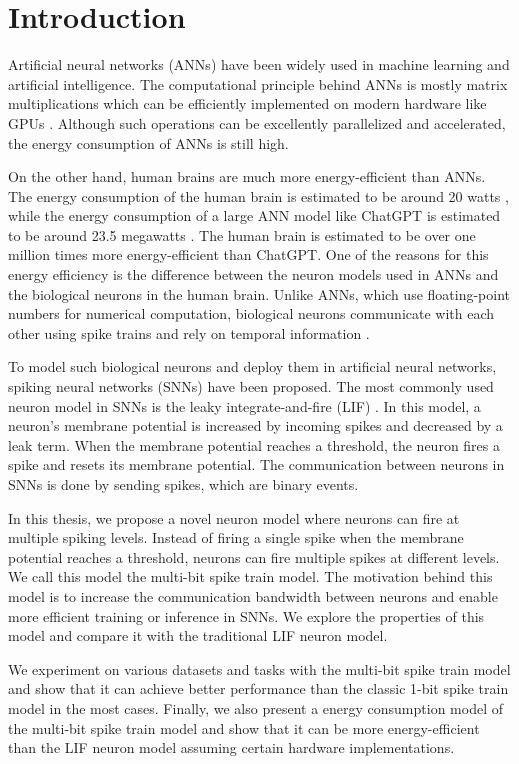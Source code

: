 \chapter{Introduction}
\label{chap:introduction}

Artificial neural networks (ANNs) \cite{mcculloch1943logical} have been widely used in machine learning and artificial intelligence. The computational principle behind ANNs is mostly matrix multiplications which can be efficiently implemented on modern hardware like GPUs \cite{oh2004gpu}. Although such operations can be excellently parallelized and accelerated, the energy consumption of ANNs is still high.

On the other hand, human brains are much more energy-efficient than ANNs. The energy consumption of the human brain is estimated to be
around 20 watts \cite{doi:10.1073/pnas.2107022118}, while the energy consumption of a large ANN model like ChatGPT is estimated to be around 23.5 megawatts \cite{DEVRIES20232191}. The human brain is estimated to be over one million times more energy-efficient than ChatGPT. One of the reasons for this energy efficiency is the difference between the neuron models used in ANNs and the biological neurons in the human brain. Unlike ANNs, which use floating-point numbers for numerical computation, biological neurons communicate with each other using spike trains and rely on temporal information \cite{jphysiol.1952.sp004764}.

To model such biological neurons and deploy them in artificial neural networks, spiking neural networks (SNNs) have been proposed. The most commonly used neuron model in SNNs is the leaky integrate-and-fire (LIF) \cite{lapicque1907louis}. In this model, a neuron's membrane potential is increased by incoming spikes and decreased by a leak term. When the membrane potential reaches a threshold, the neuron fires a spike and resets its membrane potential. The communication between neurons in SNNs is done by sending spikes, which are binary events.

In this thesis, we propose a novel neuron model where neurons can fire at multiple spiking levels. Instead of firing a single spike when the membrane potential reaches a threshold, neurons can fire multiple spikes at different levels. We call this model the multi-bit spike train model. The motivation behind this model is to increase the communication bandwidth between neurons and enable more efficient training or inference in SNNs. We explore the properties of this model and compare it with the traditional LIF neuron model.

We experiment on various datasets and tasks with the multi-bit spike train model and show that it can achieve better performance than the classic 1-bit spike train model in the most cases. Finally, we also present a energy consumption model of the multi-bit spike train model and show that it can be more energy-efficient than the LIF neuron model assuming certain hardware implementations.

